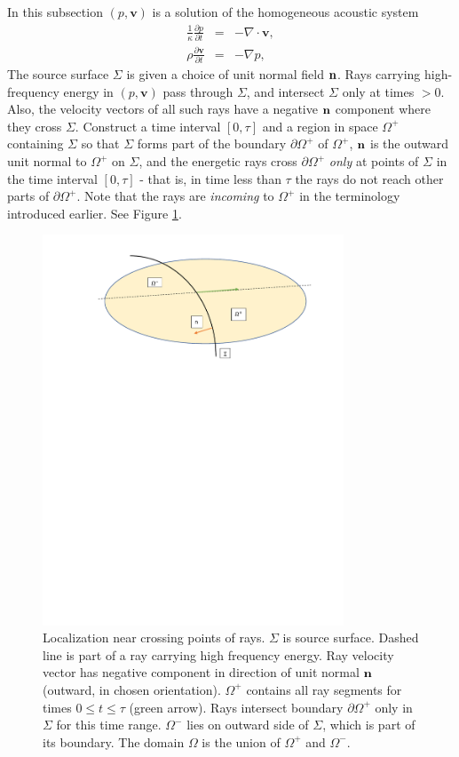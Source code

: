 \documentclass[georeport,12pt]{geophysics}
\newcommand{\bv}{\mathbf{v}}
\begin{document}
In this subsection $(p,\bv)$ is a solution of the homogeneous acoustic system
\begin{eqnarray}
\label{eqn:awebase}
  \frac{1}{\kappa}\frac{\partial p}{\partial t} & = & - \nabla \cdot \bv, \nonumber \\
  \rho\frac{\partial \bv}{\partial t} & = & - \nabla p,
\end{eqnarray}
The source surface $\Sigma$ is given a choice of unit normal field ${\bf
  n}$. Rays carrying
high-frequency energy in $(p,\bv)$ pass through $\Sigma$, and
intersect $\Sigma$ only at times
$>0$. Also, the velocity
vectors of all such rays have a negative ${\bf n}$ component where
they cross $\Sigma$. Construct a time interval $[0,\tau]$ and
a region in space $\Omega^+$ containing $\Sigma$ so that $\Sigma$ forms
part of the boundary $\partial \Omega^+$ of $\Omega^+$, ${\bf n}$ is the
outward unit normal to $\Omega^+$ on $\Sigma$, and the energetic
rays cross $\partial \Omega^+$ {\em only} at
points of $\Sigma$ in the time interval $[0,\tau]$ - that is, in time
less than $\tau$ the rays do not reach other parts of $\partial
\Omega^+$. Note that the rays are {\em incoming} to $\Omega^+$ in the terminology
introduced earlier. See Figure \ref{fig:omegarays}.

\begin{figure}
  \centering
  \includegraphics[width=0.8\textwidth]{omegarays.pdf}
  \caption{Localization near crossing points of rays. $\Sigma$ is
    source surface.  Dashed line is part of a ray carrying high
    frequency energy. Ray velocity vector has negative component in
    direction of unit normal ${\bf n}$ (outward, in chosen
    orientation). $\Omega^+$ contains all ray segments for times
    $0 \le t \le \tau$ (green arrow). Rays intersect boundary
    $\partial \Omega^+$ only in $\Sigma$ for this time
    range. $\Omega^-$ lies on outward side of $\Sigma$, which is part
    of its boundary. The domain $\Omega$ is the union of $\Omega^+$
    and $\Omega^-$.}
  \label{fig:omegarays}
\end{figure}
\end{document}
